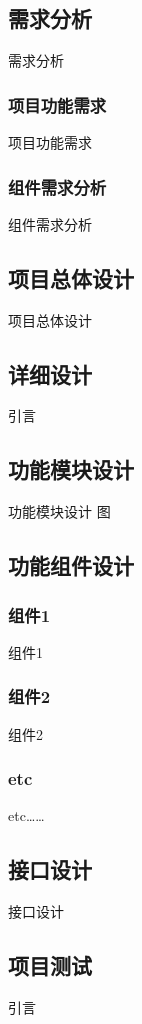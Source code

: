 \documentclass[twoside]{CUGThesis}
\begin{document}
	\subsection{需求分析}
	需求分析
		\subsubsection{项目功能需求}
		项目功能需求
		\subsubsection{组件需求分析}
		组件需求分析
	\subsection{项目总体设计}
	项目总体设计

\begin{spacing}{2}
	\section{详细设计}
\end{spacing}
引言
	\subsection{功能模块设计}
	功能模块设计
	图
	\subsection{功能组件设计}
		\subsubsection{组件1}
		组件1
		\subsubsection{组件2}
		组件2
		\subsubsection{etc}
		etc……
	\subsection{接口设计}
	接口设计

\begin{spacing}{2}
	\section{项目测试}
\end{spacing}
引言
\end{document}
